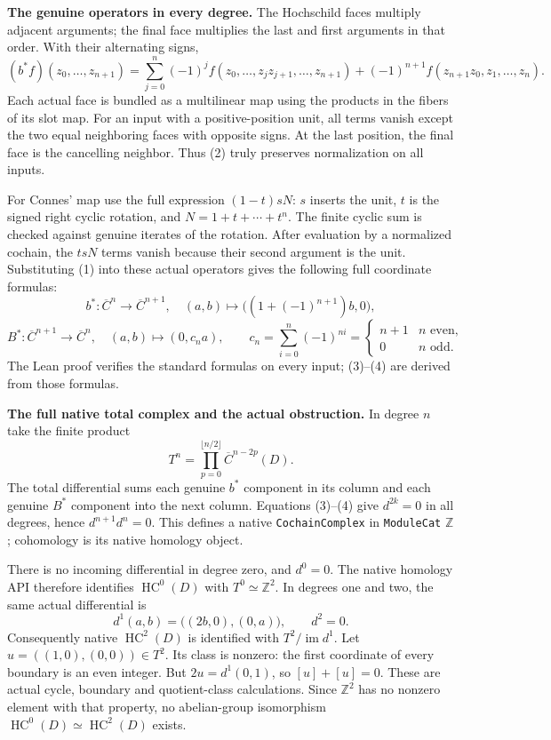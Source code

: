 \documentclass[10pt,a4paper]{article}
\newcommand{\Z}{\mathbb Z}
\newcommand{\HC}{\operatorname{HC}}
\begin{document}
\newpage
\textbf{The genuine operators in every degree.}
The Hochschild faces multiply adjacent arguments; the final face multiplies
the last and first arguments in that order. With their alternating signs,
\[
 (b^*f)(z_0,\ldots,z_{n+1})=
 \sum_{j=0}^n(-1)^j f(z_0,\ldots,z_jz_{j+1},\ldots,z_{n+1})
 +(-1)^{n+1}f(z_{n+1}z_0,z_1,\ldots,z_n).
 \tag{2}
\]
Each actual face is bundled as a multilinear map using the products in
the fibers of its slot map. For an input with a positive-position unit,
all terms vanish except the two equal neighboring faces with opposite signs.
At the last position, the final face is the cancelling neighbor. Thus
(2) truly preserves normalization on all inputs.

For Connes' map use the full expression $(1-t)sN$: $s$ inserts the unit,
$t$ is the signed right cyclic rotation, and $N=1+t+\cdots+t^n$.
The finite cyclic sum is checked against genuine iterates of the rotation.
After evaluation by a normalized cochain, the $tsN$ terms vanish because
their second argument is the unit. Substituting (1) into these actual
operators gives the following full coordinate formulas:
\[
 b^*:\overline C^n\longrightarrow\overline C^{n+1},\quad
       (a,b)\longmapsto\bigl((1+(-1)^{n+1})b,0\bigr),
 \tag{3}
\]
\[
 B^*:\overline C^{n+1}\longrightarrow\overline C^n,\quad
       (a,b)\longmapsto(0,c_n a),\qquad
 c_n=\sum_{i=0}^n(-1)^{ni}=
 \begin{cases}n+1&n\text{ even},\\0&n\text{ odd}.\end{cases}
 \tag{4}
\]
The Lean proof verifies the standard formulas on every input; (3)--(4)
are derived from those formulas.

\textbf{The full native total complex and the actual obstruction.}
In degree $n$ take the finite product
\[
 T^n=\prod_{p=0}^{\lfloor n/2\rfloor}\overline C^{n-2p}(D).
\]
The total differential sums each genuine $b^*$ component in its column
and each genuine $B^*$ component into the next column. Equations (3)--(4)
give $d^{2k}=0$ in all degrees, hence $d^{n+1}d^n=0$.
This defines a native \texttt{CochainComplex} in \texttt{ModuleCat} $\Z$;
cohomology is its native homology object.

There is no incoming differential in degree zero, and $d^0=0$.
The native homology API therefore identifies $\HC^0(D)$ with $T^0\simeq\Z^2$.
In degrees one and two, the same actual differential is
\[
 d^1(a,b)=\bigl((2b,0),(0,a)\bigr),\qquad d^2=0.
 \tag{5}
\]
Consequently native $\HC^2(D)$ is identified with
$T^2/\operatorname{im}d^1$. Let $u=((1,0),(0,0))\in T^2$.
Its class is nonzero: the first coordinate of every boundary is an even
integer. But $2u=d^1(0,1)$, so $[u]+[u]=0$.
These are actual cycle, boundary and quotient-class calculations.
Since $\Z^2$ has no nonzero element with that property, no abelian-group
isomorphism $\HC^0(D)\simeq\HC^2(D)$ exists.
\end{document}
